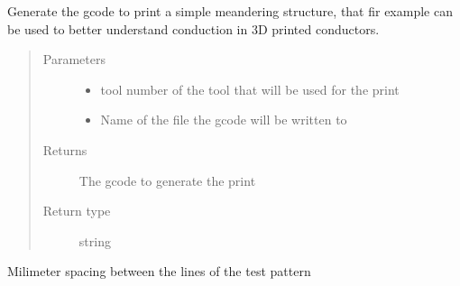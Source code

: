 \documentclass[letterpaper,10pt,english]{sphinxmanual}
\begin{document}
\begin{fulllineitems}
\begin{fulllineitems}
\label{\detokenize{index:calibration_pattern.calibration_pattern.meander_print}}
\sphinxAtStartPar
Generate the gcode to print a simple meandering structure, that fir example can be used to better understand conduction in 3D printed conductors.
\begin{quote}\begin{description}
\item[{Parameters}] \leavevmode\begin{itemize}
\item {} 
\sphinxAtStartPar
{} \textendash{} tool number of the tool that will be used for the print

\item {} 
\sphinxAtStartPar
{} \textendash{} Name of the file the gcode will be written to

\end{itemize}

\item[{Returns}] \leavevmode
\sphinxAtStartPar
The gcode to generate the print

\item[{Return type}] \leavevmode
\sphinxAtStartPar
string

\end{description}\end{quote}

\end{fulllineitems}


\begin{fulllineitems}
\label{\detokenize{index:calibration_pattern.calibration_pattern.pitch}}
\sphinxAtStartPar
Milimeter spacing between the lines of the test pattern

\end{fulllineitems}



\end{fulllineitems}
\end{document}

